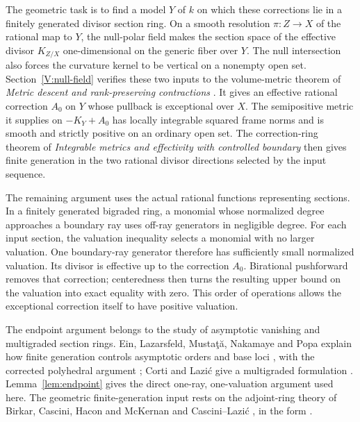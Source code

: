 The geometric task is to find a model $Y$ of $k$ on which these
corrections lie in a finitely generated divisor section ring.  On a smooth resolution $\pi:Z\to X$ of the rational map to $Y$,
the null-polar field makes the section space of the effective divisor
$K_{Z/X}$ one-dimensional on the generic fiber over $Y$.  The null
intersection also forces the curvature kernel to be vertical on a
nonempty open set.  Section~\ref{V:null-field} verifies these two
inputs to the volume-metric theorem of \emph{Metric descent and rank-preserving
contractions} \cite[Theorem \textup{(Toroidal volume metric)}]{CompanionG}.
It gives an effective rational correction $A_0$ on $Y$ whose pullback
is exceptional over $X$.  The semipositive metric it supplies on $-K_Y+A_0$ has
locally integrable squared frame norms and is smooth and strictly
positive on an ordinary open set.  The correction-ring theorem of
\emph{Integrable metrics and effectivity with controlled boundary}
\cite[Theorem \textup{(Finite generation near a correction divisor)}]{CompanionE}
then gives finite generation in the two rational divisor directions
selected by the input sequence.

The remaining argument uses the actual rational functions representing
sections.  In a finitely generated bigraded ring, a monomial whose
normalized degree approaches a boundary ray uses off-ray generators
in negligible degree.  For each input section, the valuation inequality
selects a monomial with no larger valuation.  One boundary-ray generator
therefore has sufficiently small normalized valuation.  Its divisor
is effective up to the correction $A_0$.  Birational pushforward removes
that correction; centeredness then turns the resulting upper bound on
the valuation into exact equality with zero.  This order of operations
allows the exceptional correction itself to have positive valuation.

The endpoint argument belongs to the study of asymptotic vanishing and
multigraded section rings.  Ein, Lazarsfeld, Musta\c{t}\u{a}, Nakamaye
and Popa explain how finite generation controls asymptotic orders and
base loci \cite[Section~4]{ELMNP2006}, with the corrected polyhedral
argument \cite[Proposition~1.1]{ELMNP2023Erratum}; Corti and Lazi\'c
give a multigraded formulation \cite[Theorem~3.5]{CortiLazic2013}.
Lemma~\ref{lem:endpoint} gives the direct one-ray, one-valuation
argument used here.  The geometric finite-generation input rests on
the adjoint-ring theory of Birkar, Cascini, Hacon and McKernan
\cite{BCHM2010} and Cascini--Lazi\'c \cite{CasciniLazic2012}, in the
form \cite[Theorem~3.2(1)]{CortiLazic2013}.

